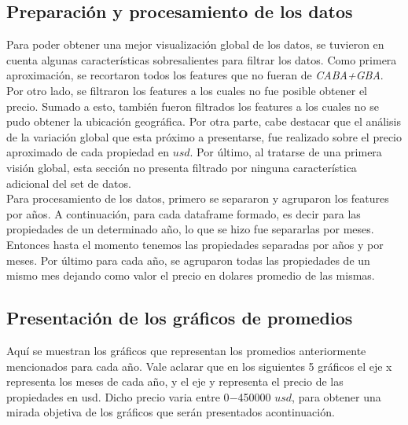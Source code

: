 \documentclass[a4paper, 10pt]{article}
\newcommand\tab[1][0.5cm]{\hspace*{#1}}
\begin{document}
      \subsection{Preparación y procesamiento de los datos}

        \tab Para poder obtener una mejor visualización global de los datos, se tuvieron en cuenta algunas características sobresalientes para filtrar los datos. Como primera aproximación, se recortaron todos los features que no fueran
        de \textit{CABA+GBA}. Por otro lado, se filtraron los features a los cuales no fue posible obtener el precio. Sumado a esto, también fueron filtrados los features a los cuales no se pudo obtener la ubicación geográfica.
        Por otra parte, cabe destacar que el análisis de la variación global que esta próximo a presentarse, fue realizado sobre el precio aproximado de cada propiedad en $usd$. Por último, al tratarse de una primera visión global, esta sección no presenta filtrado por ninguna característica adicional del set de datos.
        \\
        \tab Para procesamiento de los datos, primero se separaron y agruparon los features por años. A continuación, para cada dataframe formado, es decir para las propiedades de un determinado año, lo que se hizo fue separarlas por meses. Entonces hasta el momento tenemos las propiedades separadas por años y por meses. Por último para cada año, se agruparon todas las propiedades de un mismo mes dejando como valor el precio en dolares promedio de las mismas.

      \subsection{Presentación de los gráficos de promedios}

        \tab Aquí se muestran los gráficos que representan los promedios anteriormente mencionados para cada año.
        Vale aclarar que en los siguientes 5 gráficos el eje x representa los meses de cada año, y el eje y representa el precio de las propiedades en usd. Dicho precio varia entre 0$-$450000 $usd$, para obtener una mirada objetiva de los gráficos que serán presentados acontinuación.
\end{document}

